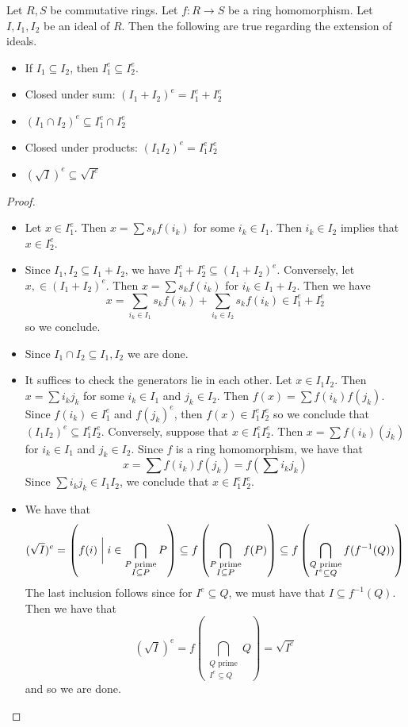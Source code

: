 \documentclass[a4paper]{article}
\begin{document}
\begin{prp}{}{} Let $R,S$ be commutative rings. Let $f:R\to S$ be a ring homomorphism. Let $I,I_1,I_2$ be an ideal of $R$. Then the following are true regarding the extension of ideals. 
\begin{itemize}
\item If $I_1\subseteq I_2$, then $I_1^e\subseteq I_2^e$. 
\item Closed under sum: $(I_1+I_2)^e=I_1^e+I_2^e$
\item $(I_1\cap I_2)^e\subseteq I_1^e\cap I_2^e$
\item Closed under products: $(I_1I_2)^e=I_1^eI_2^e$
\item $(\sqrt{I})^e\subseteq\sqrt{I^e}$
\end{itemize} 
\begin{proof}~\\
\begin{itemize}
\item Let $x\in I_1^e$. Then $x=\sum s_kf(i_k)$ for some $i_k\in I_1$. Then $i_k\in I_2$ implies that $x\in I_2^e$. 
\item Since $I_1,I_2\subseteq I_1+I_2$, we have $I_1^e+I_2^e\subseteq(I_1+I_2)^e$. Conversely, let $x,\in(I_1+I_2)^e$. Then $x=\sum s_kf(i_k)$ for $i_k\in I_1+I_2$. Then we have $$x=\sum_{i_k\in I_1}s_kf(i_k)+\sum_{i_k\in I_2}s_kf(i_k)\in I_1^e+I_2^e$$ so we conclude. 
\item Since $I_1\cap I_2\subseteq I_1,I_2$ we are done. 
\item It suffices to check the generators lie in each other. Let $x\in I_1I_2$. Then $x=\sum i_kj_k$ for some $i_k\in I_1$ and $j_k\in I_2$. Then $f(x)=\sum f(i_k)f(j_k)$. Since $f(i_k)\in I_1^e$ and $f(j_k)^e$, then $f(x)\in I_1^eI_2^e$ so we conclude that $(I_1I_2)^e\subseteq I_1^eI_2^e$. Conversely, suppose that $x\in I_1^eI_2^e$. Then $x=\sum f(i_k)(j_k)$ for $i_k\in I_1$ and $j_k\in I_2$. Since $f$ is a ring homomorphism, we have that $$x=\sum f(i_k)f(j_k)=f\left(\sum i_kj_k\right)$$ Since $\sum i_kj_k\in I_1I_2$, we conclude that $x\in I_1^eI_2^e$. 
\item We have that $$
(\sqrt{I})^e=\left(f(i)\;\bigg{|}\;i\in\bigcap_{\substack{P\text{ prime}\\I\subseteq P}}P\right)\subseteq f\left(\bigcap_{\substack{P\text{ prime}\\I\subseteq P}}f(P)\right)\subseteq f\left(\bigcap_{\substack{Q\text{ prime}\\I^e\subseteq Q}}f(f^{-1}(Q))\right)$$ The last inclusion follows since for $I^e\subseteq Q$, we must have that $I\subseteq f^{-1}(Q)$. Then we have that $$(\sqrt{I})^e=f\left(\bigcap_{\substack{Q\text{ prime}\\I^e\subseteq Q}}Q\right)=\sqrt{I^e}$$ and so we are done. 
\end{itemize}
\end{proof}
\end{prp}
\end{document}
